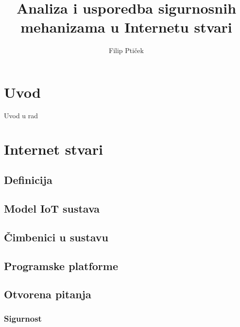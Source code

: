 \documentclass[times, utf8, diplomski]{fer}
\begin{document}

\title{Analiza i usporedba sigurnosnih mehanizama u Internetu stvari}

\author{Filip Ptiček}

\maketitle



\zahvala{}

\tableofcontents

\chapter{Uvod}
Uvod u rad

\chapter{Internet stvari}

\section{Definicija}

\section{Model IoT sustava}

\section{Čimbenici u sustavu}

\section{Programske platforme}


\section{Otvorena pitanja}

\subsection{Sigurnost}
\end{document}
